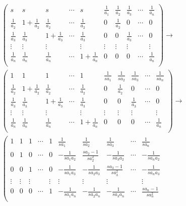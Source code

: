 \documentclass[lang=cn,newtx,10pt,scheme=chinese]{elegantbook}
\begin{document}
\begin{solution}
\begin{gather*}
\left( \begin{matrix}
s&		s&		s&		\cdots&		s&		\frac{1}{a_1}&		\frac{1}{a_2}&		\frac{1}{a_3}&		\cdots&		\frac{1}{a_n}\\
\frac{1}{a_2}&		1+\frac{1}{a_2}&		\frac{1}{a_2}&		\cdots&		\frac{1}{a_2}&		0&		\frac{1}{a_2}&		0&		\cdots&		0\\
\frac{1}{a_3}&		\frac{1}{a_3}&		1+\frac{1}{a_3}&		\cdots&		\frac{1}{a_3}&		0&		0&		\frac{1}{a_3}&		\cdots&		0\\
\vdots&		\vdots&		\vdots&		&		\vdots&		\vdots&		\vdots&		\vdots&		&		\vdots\\
\frac{1}{a_n}&		\frac{1}{a_n}&		\frac{1}{a_n}&		\cdots&		1+\frac{1}{a_n}&		0&		0&		0&		\cdots&		\frac{1}{a_n}\\
\end{matrix} \right) \rightarrow 
\\
\left( \begin{matrix}
1&		1&		1&		\cdots&		1&		\frac{1}{sa_1}&		\frac{1}{sa_2}&		\frac{1}{sa_3}&		\cdots&		\frac{1}{sa_n}\\
\frac{1}{a_2}&		1+\frac{1}{a_2}&		\frac{1}{a_2}&		\cdots&		\frac{1}{a_2}&		0&		\frac{1}{a_2}&		0&		\cdots&		0\\
\frac{1}{a_3}&		\frac{1}{a_3}&		1+\frac{1}{a_3}&		\cdots&		\frac{1}{a_3}&		0&		0&		\frac{1}{a_3}&		\cdots&		0\\
\vdots&		\vdots&		\vdots&		&		\vdots&		\vdots&		\vdots&		\vdots&		&		\vdots\\
\frac{1}{a_n}&		\frac{1}{a_n}&		\frac{1}{a_n}&		\cdots&		1+\frac{1}{a_n}&		0&		0&		0&		\cdots&		\frac{1}{a_n}\\
\end{matrix} \right) \rightarrow 
\\
\left( \begin{matrix}
1&		1&		1&		\cdots&		1&		\frac{1}{sa_1}&		\frac{1}{sa_2}&		\frac{1}{sa_3}&		\cdots&		\frac{1}{sa_n}\\
0&		1&		0&		\cdots&		0&		-\frac{1}{sa_1a_2}&		\frac{sa_2-1}{sa_{2}^{2}}&		-\frac{1}{sa_3a_2}&		\cdots&		-\frac{1}{sa_na_2}\\
0&		0&		1&		\cdots&		0&		-\frac{1}{sa_1a_3}&		-\frac{1}{sa_2a_3}&		\frac{sa_3-1}{sa_{3}^{2}}&		\cdots&		-\frac{1}{sa_na_3}\\
\vdots&		\vdots&		\vdots&		&		\vdots&		\vdots&		\vdots&		\vdots&		&		\vdots\\
0&		0&		0&		\cdots&		1&		-\frac{1}{sa_1a_n}&		-\frac{1}{sa_2a_n}&		-\frac{1}{sa_3a_n}&		\cdots&		\frac{sa_n-1}{sa_{n}^{2}}\\

\end{matrix}
\end{gather*}
\end{solution}
\end{document}
